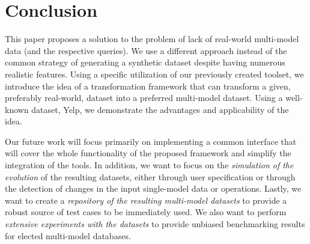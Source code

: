 \section{Conclusion}
This paper proposes a solution to the problem of lack of real-world multi-model data (and the respective queries). We use a different approach instead of the common strategy of generating a synthetic dataset despite having numerous realistic features. Using a specific utilization of our previously created toolset, we introduce the idea of a transformation framework that can transform a given, preferably real-world, dataset into a preferred multi-model dataset. Using a well-known dataset, Yelp, we demonstrate the advantages and applicability of the idea.

Our future work will focus primarily on implementing a common interface that will cover the whole functionality of the proposed framework and simplify the integration of the tools. In addition, we want to focus on the \textit{simulation of the evolution} of the resulting datasets, either through user specification or through the detection of changes in the input single-model data or operations. Lastly, we want to create a \textit{repository of the resulting multi-model datasets} to provide a robust source of test cases to be immediately used. We also want to perform \textit{extensive experiments with the datasets} to provide unbiased benchmarking results for elected multi-model databases.




